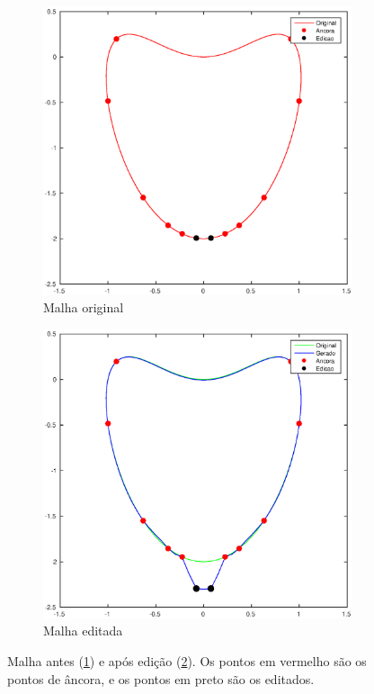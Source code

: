 \begin{figure}[ht!]
	\centering
	\begin{subfigure}[b]{0.45\textwidth}
         \centering
         \includegraphics[width=\textwidth]{imagens/cap4/malhaoriginal.eps}
         \caption{Malha original}
         \label{fig:meshorigiedit}
     \end{subfigure}
     \hfill
     \begin{subfigure}[b]{0.45\textwidth}
         \centering
         \includegraphics[width=\textwidth]{imagens/cap4/malhaedicao.eps}
         \caption{Malha editada}
         \label{fig:mesheditededit}
     \end{subfigure}
     \caption{Malha antes (\ref{fig:meshorigiedit}) e após edição (\ref{fig:mesheditededit}). Os pontos em vermelho são os pontos de âncora, e os pontos em preto são os editados.}
    \label{fig:editedmesh}
\end{figure}

